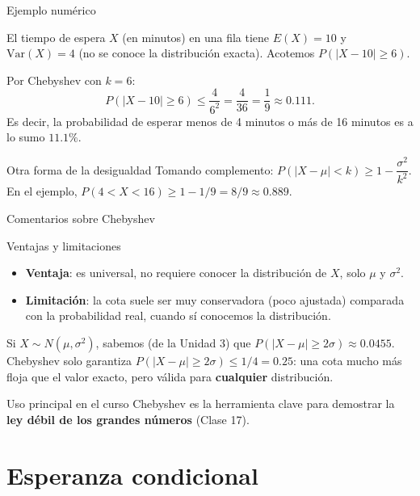 \documentclass[aspectratio=169,11pt]{beamer}
\begin{document}
\begin{frame}{Ejemplo numérico}
\begin{example}
El tiempo de espera $X$ (en minutos) en una fila tiene $E(X) = 10$ y $\text{Var}(X) = 4$ (no se conoce la distribución exacta). Acotemos $P(|X-10|\geq 6)$.

\medskip
Por Chebyshev con $k=6$:
\[
P(|X-10|\geq 6) \leq \frac{4}{6^2} = \frac{4}{36} = \frac{1}{9} \approx 0.111.
\]
Es decir, la probabilidad de esperar menos de 4 minutos o más de 16 minutos es a lo sumo $11.1\%$.
\end{example}

\begin{block}{Otra forma de la desigualdad}
Tomando complemento: $P(|X-\mu| < k) \geq 1 - \dfrac{\sigma^2}{k^2}$. En el ejemplo, $P(4 < X < 16) \geq 1 - 1/9 = 8/9 \approx 0.889$.
\end{block}
\end{frame}

\begin{frame}{Comentarios sobre Chebyshev}
\begin{alertblock}{Ventajas y limitaciones}
\begin{itemize}
\item \textbf{Ventaja}: es universal, no requiere conocer la distribución de $X$, solo $\mu$ y $\sigma^2$.
\item \textbf{Limitación}: la cota suele ser muy conservadora (poco ajustada) comparada con la probabilidad real, cuando sí conocemos la distribución.
\end{itemize}
\end{alertblock}

\begin{example}
Si $X \sim N(\mu,\sigma^2)$, sabemos (de la Unidad 3) que $P(|X-\mu|\geq 2\sigma) \approx 0.0455$. Chebyshev solo garantiza $P(|X-\mu|\geq 2\sigma) \leq 1/4 = 0.25$: una cota mucho más floja que el valor exacto, pero válida para \textbf{cualquier} distribución.
\end{example}

\begin{block}{Uso principal en el curso}
Chebyshev es la herramienta clave para demostrar la \textbf{ley débil de los grandes números} (Clase 17).
\end{block}
\end{frame}

\section{Esperanza condicional}
\end{document}
